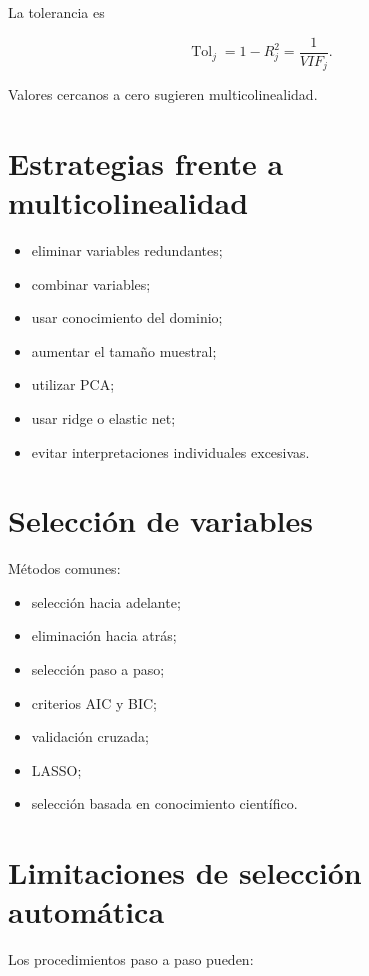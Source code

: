 \documentclass[
  spanish,
  11pt,
  letterpaper,
  DIV=11,
  numbers=noendperiod]{scrreprt}
\providecommand{\tightlist}{%
  \setlength{\itemsep}{0pt}\setlength{\parskip}{0pt}}
\theoremstyle{definition}
\theoremstyle{plain}
\theoremstyle{definition}
\theoremstyle{remark}
\begin{document}
La tolerancia es

\[
\operatorname{Tol}_j
=
1-R_j^2
=
\frac{1}{VIF_j}.
\]

Valores cercanos a cero sugieren multicolinealidad.

\section{Estrategias frente a
multicolinealidad}\label{estrategias-frente-a-multicolinealidad}

\begin{itemize}
\tightlist
\item
  eliminar variables redundantes;
\item
  combinar variables;
\item
  usar conocimiento del dominio;
\item
  aumentar el tamaño muestral;
\item
  utilizar PCA;
\item
  usar ridge o elastic net;
\item
  evitar interpretaciones individuales excesivas.
\end{itemize}

\section{Selección de variables}\label{selecciuxf3n-de-variables-1}

Métodos comunes:

\begin{itemize}
\tightlist
\item
  selección hacia adelante;
\item
  eliminación hacia atrás;
\item
  selección paso a paso;
\item
  criterios AIC y BIC;
\item
  validación cruzada;
\item
  LASSO;
\item
  selección basada en conocimiento científico.
\end{itemize}

\section{Limitaciones de selección
automática}\label{limitaciones-de-selecciuxf3n-automuxe1tica}

Los procedimientos paso a paso pueden:
\end{document}
